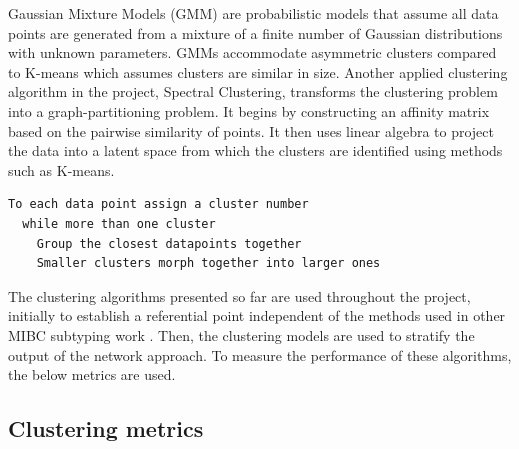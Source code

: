 Gaussian Mixture Models (GMM) are probabilistic models that assume all data points are generated from a mixture of a finite number of Gaussian distributions with unknown parameters. GMMs accommodate asymmetric clusters compared to K-means which assumes clusters are similar in size. Another applied clustering algorithm in the project, Spectral Clustering, transforms the clustering problem into a graph-partitioning problem. It begins by constructing an affinity matrix based on the pairwise similarity of points. It then uses linear algebra to project the data into a latent space from which the clusters are identified using methods such as K-means.
~\\
\begin{lstlisting}[caption={Agglomerative hierarchical clustering pseudocode}, label={code:agg_clustering}]
  To each data point assign a cluster number
  while more than one cluster
    Group the closest datapoints together 
    Smaller clusters morph together into larger ones
\end{lstlisting} 

The clustering algorithms presented so far are used throughout the project, initially to establish a referential point independent of the methods used in other MIBC subtyping work \cite{Robertson2017-mg, Marzouka2018-ge, Kamoun2020-tj}. Then, the clustering models are used to stratify the output of the network approach. To measure the performance of these algorithms, the below metrics are used.


\subsection*{Clustering metrics} \label{s:lit:clustering_metrics}

